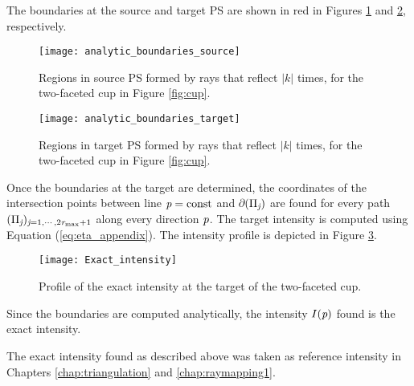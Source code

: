 The boundaries at the source and target PS are shown in red in Figures \ref{fig:boundary} and \ref{boundaries_target}, respectively. 
\begin{figure}[htbp]
\centering
\texttt{[image: analytic\_boundaries\_source]}
\caption{Regions in source PS formed by rays that reflect $|k|$ times, for the two-faceted cup in Figure \ref{fig:cup}.}
\label{fig:boundary}
\end{figure}
\begin{figure}[htbp]
\centering
\texttt{[image: analytic\_boundaries\_target]}
\caption{Regions in target PS formed by rays that reflect $|k|$ times, for the two-faceted cup in Figure \ref{fig:cup}.}
\label{boundaries_target}
\end{figure}
Once the boundaries at the target are determined, the coordinates of the intersection points between line $\textit{p}=\textrm{const}$ and $\partial$$(\Pi_{\textit{j}})$ are found for every path $(\Pi_{\textit{j}})_{\textit{j}=1, \cdots, 2\textit{r}_{\textrm{max}}+1}$ along every direction $\textit{p}$. The target intensity is computed using Equation (\ref{eq:eta_appendix}). The intensity profile is depicted in Figure \ref{fig:intensity_cup_analytic}. 
\begin{figure}[t]
\centering
\texttt{[image: Exact\_intensity]}
\caption{Profile of the exact intensity at the target of the two-faceted cup.}
\label{fig:intensity_cup_analytic}
\end{figure}
Since the boundaries are computed analytically, the intensity $I(\textit{p})$ found is the exact intensity.

The exact intensity found as described above was taken as reference intensity in Chapters \ref{chap:triangulation} and \ref{chap:raymapping1}.

